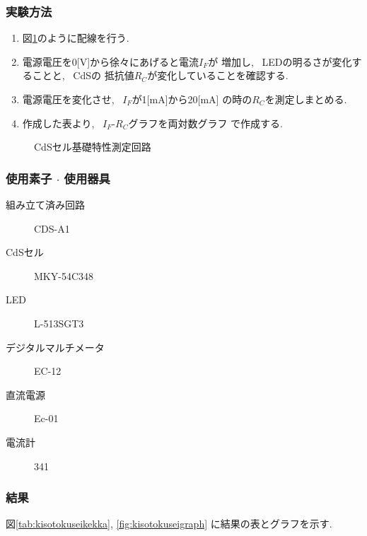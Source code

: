 \documentclass[titlepage]{jsarticle}
\begin{document}
        \subsubsection{実験方法}
            \begin{enumerate}
                \item 図\ref{fig:kisotokusei}のように配線を行う.
                \item 電源電圧を0[V]から徐々にあげると電流$I_F$が
                    増加し, ~LEDの明るさが変化することと, ~CdSの
                    抵抗値$R_C$が変化していることを確認する.
                \item 電源電圧を変化させ, ~$I_F$が1[mA]から20[mA]
                    の時の$R_C$を測定しまとめる.
                \item 作成した表より, ~$I_F$-$R_C$グラフを両対数グラフ
                    で作成する.
            \end{enumerate}

            \begin{figure}[ht]
                \centering
                \caption{CdSセル基礎特性測定回路}
                \label{fig:kisotokusei}
            \end{figure}

        \subsubsection{使用素子 $\cdot$ 使用器具}
            \begin{description}
                \item[組み立て済み回路] CDS-A1
                \item[CdSセル] MKY-54C348
                \item[LED] L-513SGT3
                \item[デジタルマルチメータ] EC-12
                \item[直流電源] Ec-01
                \item[電流計] 341 
            \end{description}

        \subsubsection{結果}
            図\ref{tab:kisotokuseikekka}, \ref{fig:kisotokuseigraph}
            に結果の表とグラフを示す.
\end{document}
